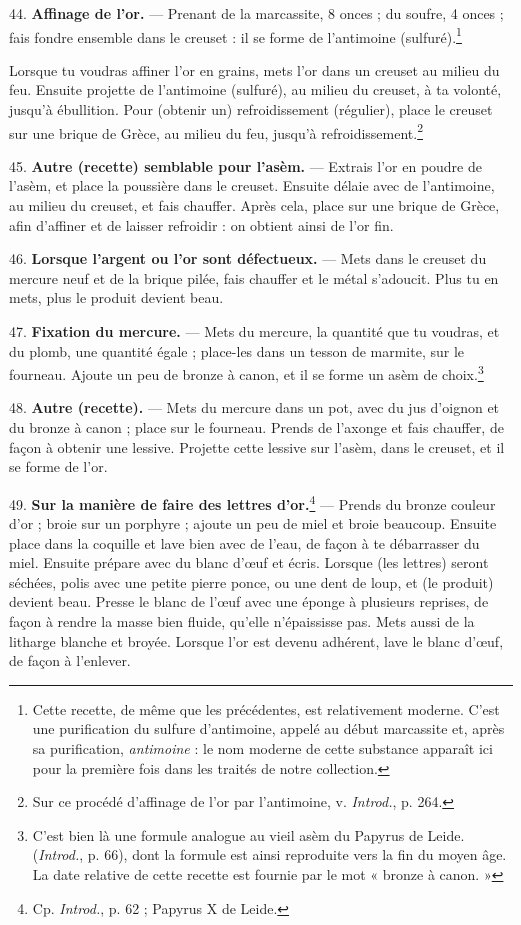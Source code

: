 \documentclass[a4paper, 11pt, oneside, polutonikogreek, french]{article}
\begin{document}
44. \textbf{Affinage de l'or.} --- Prenant de la marcassite, 8 onces ; du soufre, 4 onces ; fais fondre ensemble dans le creuset : il se forme de l'antimoine (sulfuré).\footnote{Cette recette, de même que les précédentes, est relativement moderne. C'est une purification du sulfure d'antimoine, appelé au début marcassite et, après sa purification, \emph{antimoine} : le nom moderne de cette substance apparaît ici pour la première fois dans les traités de notre collection.}

Lorsque tu voudras affiner l'or en grains, mets l'or dans un creuset au milieu du feu. Ensuite projette de l'antimoine (sulfuré), au milieu du creuset, à ta volonté, jusqu'à ébullition. Pour (obtenir un) refroidissement (régulier), place le creuset sur une brique de Grèce, au milieu du feu, jusqu'à refroidissement.\footnote{Sur ce procédé d'affinage de l'or par l'antimoine, v. \emph{Introd.}, p. 264.}

45. \textbf{Autre (recette) semblable pour l'asèm.} --- Extrais l'or en poudre de l'asèm, et place la poussière dans le creuset. Ensuite délaie avec de l'antimoine, au milieu du creuset, et fais chauffer. Après cela, place sur une brique de Grèce, afin d'affiner et de laisser refroidir : on obtient ainsi de l'or fin.

46. \textbf{Lorsque l'argent ou l'or sont défectueux.} --- Mets dans le creuset du mercure neuf et de la brique pilée, fais chauffer et le métal s'adoucit. Plus tu en mets, plus le produit devient beau.

47. \textbf{Fixation du mercure.} --- Mets du mercure, la quantité que tu voudras, et du plomb, une quantité égale ; place-les dans un tesson de marmite, sur le fourneau. Ajoute un peu de bronze à canon, et il se forme un asèm de choix.\footnote{C'est bien là une formule analogue au vieil asèm du Papyrus de Leide. (\emph{Introd.}, p. 66), dont la formule est ainsi reproduite vers la fin du moyen âge. La date relative de cette recette est fournie par le mot « bronze à canon. »}

48. \textbf{Autre (recette).} --- Mets du mercure dans un pot, avec du jus d'oignon et du bronze à canon ; place sur le fourneau. Prends de l'axonge et fais chauffer, de façon à obtenir une lessive. Projette cette lessive sur l'asèm, dans le creuset, et il se forme de l'or.

49. \textbf{Sur la manière de faire des lettres d'or.}\footnote{Cp. \emph{Introd.}, p. 62 ; Papyrus X de Leide.} --- Prends du bronze couleur d'or ; broie sur un porphyre ; ajoute un peu de miel et broie beaucoup. Ensuite place dans la coquille et lave bien avec de l'eau, de façon à te débarrasser du miel. Ensuite prépare avec du blanc d'œuf et écris. Lorsque (les lettres) seront séchées, polis avec une petite pierre ponce, ou une dent de loup, et (le produit) devient beau. Presse le blanc de l'œuf avec une éponge à plusieurs reprises, de façon à rendre la masse bien fluide, qu'elle n'épaississe pas. Mets aussi de la litharge blanche et broyée. Lorsque l'or est devenu adhérent, lave le blanc d'œuf, de façon à l'enlever.
\end{document}
